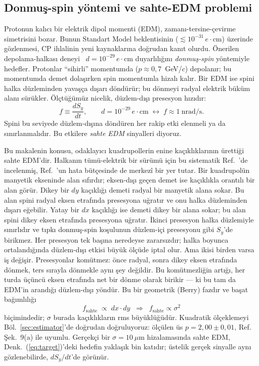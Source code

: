 \documentclass[aps,prab,reprint,superscriptaddress,nofootinbib]{revtex4-2}
\begin{document}
\subsection{Donmuş-spin yöntemi ve sahte-EDM problemi}
\label{sec:problem}

Protonun kalıcı bir elektrik dipol momenti (EDM), zamanı-tersine-çevirme
simetrisini bozar. Bunun Standart Model beklentisinin
($\lesssim 10^{-31}\,e\!\cdot\!$cm) üzerinde gözlenmesi, CP ihlalinin yeni
kaynaklarına doğrudan kanıt olurdu. Önerilen depolama-halkası deneyi~\cite{omarov}
$d = 10^{-29}\,e\!\cdot\!$cm duyarlılığını \emph{donmuş-spin} yöntemiyle hedefler.
Protonlar ``sihirli'' momentumda ($p \approx 0{,}7$~GeV/$c$) depolanır; bu
momentumda demet dolaşırken spin momentumla hizalı kalır. Bir EDM ise spini halka
düzleminden yavaşça dışarı döndürür; bu dönmeyi radyal elektrik büküm alanı
sürükler. Ölçtüğümüz nicelik, düzlem-dışı presesyon hızıdır:
\begin{equation}
  f \equiv \frac{dS_y}{dt}, \qquad
  d = 10^{-29}\,e\!\cdot\!\text{cm} \;\leftrightarrow\;
  f \approx 1~\text{nrad/s}.
  \label{eq:target}
\end{equation}
Spini bu seviyede düzlem-dışına döndüren her rakip etki elenmeli ya da
sınırlanmalıdır. Bu etkilere \emph{sahte EDM} sinyalleri diyoruz.

Bu makalenin konusu, odaklayıcı kuadrupollerin enine kaçıklıklarının ürettiği
sahte EDM'dir. Halkanın tümü-elektrik bir sürümü için bu sistematik
Ref.~\cite{haciomeroglu2017}'de incelenmiş, Ref.~\cite{omarov}'un hata bütçesinde
de merkezî bir yer tutar. Bir kuadrupolün manyetik ekseninde alan sıfırdır;
eksen-dışı geçen demet ise kaçıklıkla orantılı bir alan görür. Dikey bir $dy$
kaçıklığı demeti radyal bir manyetik alana sokar. Bu alan spini radyal eksen
etrafında presesyona uğratır ve onu halka düzleminden dışarı eğebilir. Yatay bir
$dx$ kaçıklığı ise demeti dikey bir alana sokar; bu alan spini dikey eksen
etrafında presesyona uğratır. İkinci presesyon halka düzlemiyle sınırlıdır ve tıpkı
donmuş-spin koşulunun düzlem-içi presesyonu gibi $S_y$'de birikmez. Her presesyon
tek başına neredeyse zararsızdır; halka boyunca ortalandığında düzlem-dışı etkisi
büyük ölçüde iptal olur. Ama ikisi birden varsa iş değişir. Presesyonlar komütmez:
önce radyal, sonra dikey eksen etrafında dönmek, ters sırayla dönmekle aynı şey
değildir. Bu komütmezliğin artığı, her turda üçüncü eksen etrafında net bir dönme
olarak birikir --- ki bu tam da EDM'in arandığı düzlem-dışı yöndür. Bu bir
geometrik (Berry) fazdır ve başat bağımlılığı
\begin{equation}
  f_{\text{sahte}} \;\propto\; dx \cdot dy
  \;\;\Longrightarrow\;\;
  f_{\text{sahte}} \propto \sigma^2
  \label{eq:sigma2}
\end{equation}
biçimindedir; $\sigma$ burada kaçıklıkların rms büyüklüğüdür. Kuadratik ölçeklemeyi
Böl.~\ref{sec:estimator}'de doğrudan doğruluyoruz: ölçülen üs $p = 2{,}00 \pm 0{,}01$,
Ref.~\cite{omarov} Şek.~9(a) ile uyumlu. Gerçekçi bir $\sigma = 10~\mu$m
hizalamasında sahte EDM, Denk.~(\ref{eq:target})'deki hedefin yaklaşık bin katıdır;
üstelik gerçek sinyalle aynı gözlenebilirde, $dS_y/dt$'de görünür.
\end{document}
